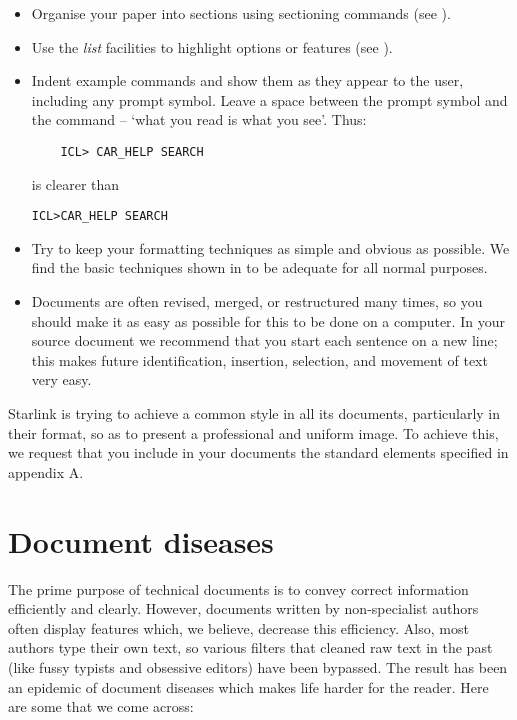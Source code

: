 \begin{itemize}

\item Organise your paper into sections using sectioning commands (see 
).

\item Use the {\em list}\/ facilities to highlight options or features
(see 
).

\item Indent example commands and show them as they appear to the user,
including any prompt symbol.
Leave a space between the prompt symbol and the command -- `what you read is
what you see'.
Thus:
\begin{verbatim}
    ICL> CAR_HELP SEARCH
\end{verbatim}
is clearer than
\begin{verbatim}
ICL>CAR_HELP SEARCH
\end{verbatim}

\item Try to keep your formatting techniques as simple and obvious as possible.
We find the basic techniques shown in  to be adequate for
all normal purposes.

\item Documents are often revised, merged, or restructured many times, so
you should make it as easy as possible for this to be done on a computer.
In your source document we recommend that you start each sentence on a new
line; this makes future identification, insertion, selection, and movement
of text very easy.

\end{itemize}

Starlink is trying to achieve a common style in all its documents, particularly
in their format, so as to present a professional and uniform image.
To achieve this, we request that you include in your documents the standard
elements specified in appendix A.

\section{Document diseases}

The prime purpose of technical documents is to convey correct information
efficiently and clearly.
However, documents written by non-specialist authors often display features
which, we believe, decrease this efficiency.
Also, most authors type their own text, so various filters that cleaned raw
text in the past (like fussy typists and obsessive editors) have been bypassed.
The result has been an epidemic of document diseases which makes life harder
for the reader.
Here are some that we come across:

